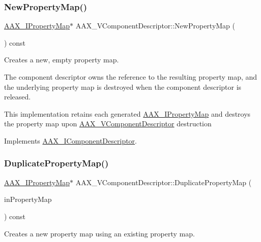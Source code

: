 \subsubsection{\texorpdfstring{NewPropertyMap()}{NewPropertyMap()}}
{\footnotesize\ttfamily \mbox{\hyperlink{a01869}{A\+A\+X\+\_\+\+I\+Property\+Map}}$\ast$ A\+A\+X\+\_\+\+V\+Component\+Descriptor\+::\+New\+Property\+Map (\begin{DoxyParamCaption}{ }\end{DoxyParamCaption}) const\hspace{0.3cm}{\ttfamily [virtual]}}



Creates a new, empty property map. 

The component descriptor owns the reference to the resulting property map, and the underlying property map is destroyed when the component descriptor is released.

This implementation retains each generated \mbox{\hyperlink{a01869}{A\+A\+X\+\_\+\+I\+Property\+Map}} and destroys the property map upon \mbox{\hyperlink{a01901}{A\+A\+X\+\_\+\+V\+Component\+Descriptor}} destruction 

Implements \mbox{\hyperlink{a01781_a0d7dd21daa8bc588d6a1145c3eb7ef98}{A\+A\+X\+\_\+\+I\+Component\+Descriptor}}.

\mbox{\label{a01901_ae6b016afd2eda4c467471695804937be}} 
\subsubsection{\texorpdfstring{DuplicatePropertyMap()}{DuplicatePropertyMap()}}
{\footnotesize\ttfamily \mbox{\hyperlink{a01869}{A\+A\+X\+\_\+\+I\+Property\+Map}}$\ast$ A\+A\+X\+\_\+\+V\+Component\+Descriptor\+::\+Duplicate\+Property\+Map (\begin{DoxyParamCaption}\item[{\mbox{\hyperlink{a01869}{A\+A\+X\+\_\+\+I\+Property\+Map}} $\ast$}]{in\+Property\+Map }\end{DoxyParamCaption}) const\hspace{0.3cm}{\ttfamily [virtual]}}



Creates a new property map using an existing property map. 

